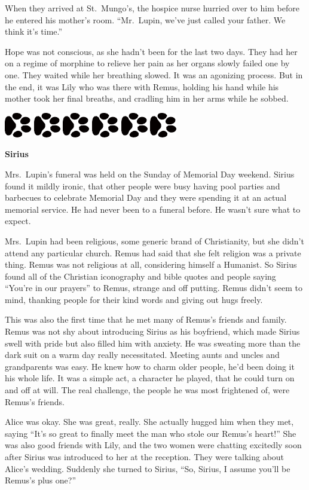 \documentclass[12pt,twoside,openright]{memoir}
\newcommand{\myrulez}{	
	\begin{center}
		\hspace{.5em}
		\includegraphics[angle=60]{dogprint.pdf}
		\hspace{.5em}
		\includegraphics[angle=120]{dogprint.pdf}
		\hspace{.5em}
		\includegraphics[angle=60]{dogprint.pdf}
		\hspace{.5em}
		\includegraphics[angle=120]{dogprint.pdf}
		\hspace{.5em}
		\includegraphics[angle=60]{dogprint.pdf}
		\hspace{.5em}
		\includegraphics[angle=120]{dogprint.pdf}
		\hspace{.5em}
	\end{center}
}
\begin{document}
When they arrived at St.\ Mungo's, the hospice nurse hurried over to him before he entered his mother's room. ``Mr.\ Lupin, we've just called your father. We think it's time.''

Hope was not conscious, as she hadn't been for the last two days. They had her on a regime of morphine to relieve her pain as her organs slowly failed one by one. They waited while her breathing slowed. It was an agonizing process. But in the end, it was Lily who was there with Remus, holding his hand while his mother took her final breaths, and cradling him in her arms while he sobbed.

\myrulez

\textbf{Sirius} 

Mrs.\ Lupin's funeral was held on the Sunday of Memorial Day weekend. Sirius found it mildly ironic, that other people were busy having pool parties and barbecues to celebrate Memorial Day and they were spending it at an actual memorial service. He had never been to a funeral before. He wasn't sure what to expect.

Mrs.\ Lupin had been religious, some generic brand of Christianity, but she didn't attend any particular church. Remus had said that she felt religion was a private thing. Remus was not religious at all, considering himself a Humanist. So Sirius found all of the Christian iconography and bible quotes and people saying ``You're in our prayers'' to Remus, strange and off putting. Remus didn't seem to mind, thanking people for their kind words and giving out hugs freely. 

This was also the first time that he met many of Remus's friends and family. Remus was not shy about introducing Sirius as his boyfriend, which made Sirius swell with pride but also filled him with anxiety. He was sweating more than the dark suit on a warm day really necessitated. Meeting aunts and uncles and grandparents was easy. He knew how to charm older people, he'd been doing it his whole life. It was a simple act, a character he played, that he could turn on and off at will. The real challenge, the people he was most frightened of, were Remus's friends.

Alice was okay. She was great, really. She actually hugged him when they met, saying ``It's so great to finally meet the man who stole our Remus's heart!'' She was also good friends with Lily, and the two women were chatting excitedly soon after Sirius was introduced to her at the reception. They were talking about Alice's wedding. Suddenly she turned to Sirius, ``So, Sirius, I assume you'll be Remus's plus one?''
\end{document}
